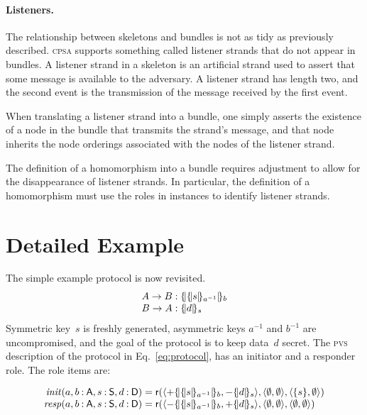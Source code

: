 \documentclass[titlepage,12pt]{article}
\newcommand{\cpsa}{\textsc{cpsa}}
\newcommand{\pvs}{\textsc{pvs}}
\newcommand{\fn}[1]{\ensuremath{\operatorname{\mathit{#1}}}}
\newcommand{\srt}[1]{\ensuremath{\mathsf{#1}}}
\newcommand{\typ}{\mathbin:}
\newcommand{\enc}[2]{\ensuremath{\{\!|#1|\!\}_{#2}}}
\newcommand{\invk}[1]{{#1}^{-1}}
\newcommand{\inbnd}{\mathord -}
\newcommand{\outbnd}{\mathord +}
\newcommand{\init}{\fn{init}}
\newcommand{\resp}{\fn{resp}}
\newcommand{\role}{\mathsf{r}}
\begin{document}
\paragraph{Listeners.}

The relationship between skeletons and bundles is not as tidy as
previously described.  {\cpsa} supports something called
listener strands that do not appear in
bundles.  A listener strand in a skeleton is an artificial strand used
to assert that some message is available to the adversary.  A listener
strand has length two, and the second event is the transmission of the
message received by the first event.

When translating a listener strand into a bundle, one simply asserts
the existence of a node in the bundle that transmits the strand's
message, and that node inherits the node orderings associated with
the nodes of the listener strand.

The definition of a homomorphism into a bundle requires adjustment to
allow for the disappearance of listener strands.  In particular, the
definition of a homomorphism must use the roles in instances to
identify listener strands.

\section{Detailed Example}\label{sec:example}

The simple example protocol is now revisited.
$$\begin{array}{r@{{}:{}}l}
A\to B&\enc{\enc{s}{\invk{a}}}{b}\\
B\to A&\enc{d}{s}
\end{array}$$
Symmetric key~$s$ is freshly generated, asymmetric keys $\invk{a}$ and
$\invk{b}$ are uncompromised, and the goal of the protocol is to keep
data~$d$ secret.  The {\pvs} description of the protocol in
Eq.~\ref{eq:protocol}, has an initiator and a responder role.  The
role items are:

\begin{equation}\label{eq:cpsa protocol}
\begin{array}{r@{{}={}}l}
\init(a,b\typ\srt{A},s\typ\srt{S},d\typ\srt{D})&
\role(\langle\outbnd\enc{\enc{s}{\invk{a}}}{b},\inbnd\enc{d}{s}\rangle,
\langle\emptyset,\emptyset\rangle,
\langle\{s\},\emptyset\rangle)\\
\resp(a,b\typ\srt{A},s\typ\srt{S},d\typ\srt{D})&
\role(\langle\inbnd\enc{\enc{s}{\invk{a}}}{b},\outbnd\enc{d}{s}\rangle,
\langle\emptyset,\emptyset\rangle,
\langle\emptyset,\emptyset\rangle)
\end{array}
\end{equation}
\end{document}
